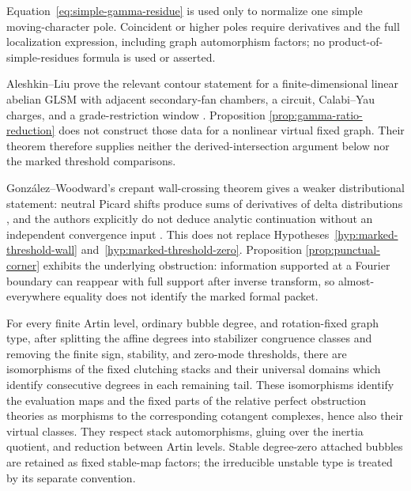 \begin{remark}
\label{rem:higher-pole-localization-boundary}
Equation~\eqref{eq:simple-gamma-residue} is used only to normalize one simple
moving-character pole.  Coincident or higher poles require derivatives and
the full localization expression, including graph automorphism factors; no
product-of-simple-residues formula is used or asserted.
\end{remark}

\begin{remark}
\label{rem:neutral-boundary}
Aleshkin--Liu prove the relevant contour statement for a
finite-dimensional linear abelian GLSM with adjacent secondary-fan chambers,
a circuit, Calabi--Yau charges, and a grade-restriction window
\cite[Definition~5.18, Remark~5.20 and Theorem~5.21]{AleshkinLiu}.  Proposition
\ref{prop:gamma-ratio-reduction} does not construct those data for a nonlinear
virtual fixed graph.  Their theorem therefore supplies neither the
derived-intersection argument below nor the marked threshold comparisons.

Gonz\'alez--Woodward's crepant wall-crossing theorem gives a weaker
distributional statement: neutral Picard shifts produce sums of derivatives
of delta distributions
\cite[Remark~1.18(d), Remark~4.6, and equation~(47)]{GonzalezWoodward},
and the authors explicitly do not deduce analytic continuation without an
independent convergence input \cite[Remark~4.7]{GonzalezWoodward}.  This does
not replace Hypotheses~\ref{hyp:marked-threshold-wall}
and~\ref{hyp:marked-threshold-zero}.  Proposition
\ref{prop:punctual-corner} exhibits the underlying obstruction: information
supported at a Fourier boundary can reappear with full support after inverse
transform, so almost-everywhere equality does not identify the marked formal
packet.
\end{remark}

\begin{theorem}
\label{thm:tailwise-derived}
For every finite Artin level, ordinary bubble degree, and rotation-fixed
graph type, after splitting the affine degrees into stabilizer congruence
classes and removing the finite sign, stability, and zero-mode thresholds,
there are isomorphisms of the fixed clutching stacks and their universal
domains which identify consecutive degrees in each remaining tail.  These
isomorphisms identify the evaluation maps and the fixed parts of the relative
perfect obstruction theories as
morphisms to the corresponding cotangent complexes, hence also their virtual
classes.  They respect stack automorphisms, gluing over the inertia quotient,
and reduction between Artin levels.  Stable degree-zero attached bubbles are
retained as fixed stable-map factors; the irreducible unstable type is treated
by its separate convention.
\end{theorem}

